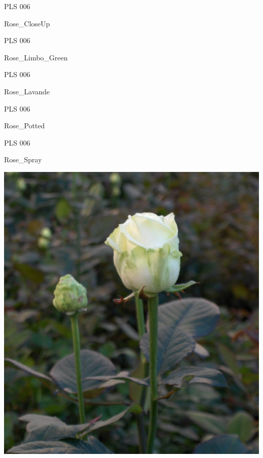 \documentclass{article}
\begin{document}
\noindent  PLS 006
\vfill
\centerline{{\huge Rose\_CloseUp }}
\vfill
\newpage

\noindent  PLS 006
\vfill
\centerline{{\huge Rose\_Limbo\_Green }}
\vfill
\newpage

\noindent  PLS 006
\vfill
\centerline{{\huge Rose\_Lavande }}
\vfill
\newpage

\noindent  PLS 006
\vfill
\centerline{{\huge Rose\_Potted }}
\vfill
\newpage

\noindent  PLS 006
\vfill
\centerline{{\huge Rose\_Spray }}
\vfill
\newpage

\begin{center}
\includegraphics[height=0.925\paperheight]{../Rose_Akito.jpg}
\end{center}
\newpage
\end{document}
